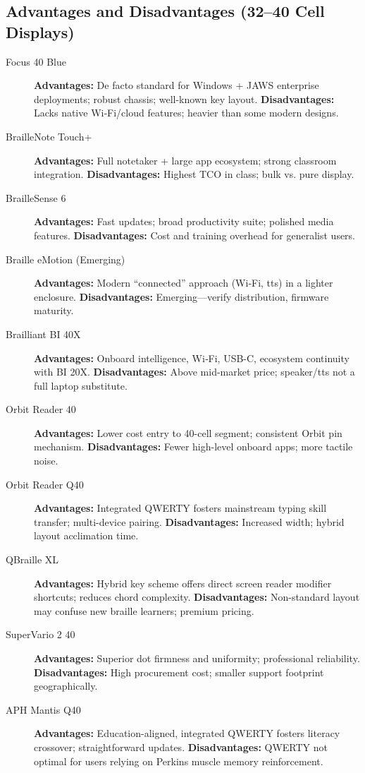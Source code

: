 \subsection*{Advantages and Disadvantages (32--40 Cell Displays)}
\begin{description}
	\item[Focus 40 Blue] \textbf{Advantages:} De facto standard for Windows + JAWS enterprise deployments; robust chassis; well-known key layout. \textbf{Disadvantages:} Lacks native Wi‑Fi/cloud features; heavier than some modern designs.
	\item[BrailleNote Touch+] \textbf{Advantages:} Full notetaker + large app ecosystem; strong classroom integration. \textbf{Disadvantages:} Highest TCO in class; bulk vs. pure display.
	\item[BrailleSense 6] \textbf{Advantages:} Fast updates; broad productivity suite; polished media features. \textbf{Disadvantages:} Cost and training overhead for generalist users.
	\item[Braille eMotion (Emerging)] \textbf{Advantages:} Modern “connected” approach (Wi‑Fi, \gls{tts}) in a lighter enclosure. \textbf{Disadvantages:} Emerging—verify distribution, firmware maturity.
	\item[Brailliant BI 40X] \textbf{Advantages:} Onboard intelligence, Wi‑Fi, USB-C, ecosystem continuity with BI 20X. \textbf{Disadvantages:} Above mid-market price; speaker/\gls{tts} not a full laptop substitute.
	\item[Orbit Reader 40] \textbf{Advantages:} Lower cost entry to 40-cell segment; consistent Orbit pin mechanism. \textbf{Disadvantages:} Fewer high-level onboard apps; more tactile noise.
	\item[Orbit Reader Q40] \textbf{Advantages:} Integrated QWERTY fosters mainstream typing skill transfer; multi-device pairing. \textbf{Disadvantages:} Increased width; hybrid layout acclimation time.
	\item[QBraille XL] \textbf{Advantages:} Hybrid key scheme offers direct screen reader modifier shortcuts; reduces chord complexity. \textbf{Disadvantages:} Non-standard layout may confuse new braille learners; premium pricing.
	\item[SuperVario 2 40] \textbf{Advantages:} Superior dot firmness and uniformity; professional reliability. \textbf{Disadvantages:} High procurement cost; smaller support footprint geographically.
	\item[APH Mantis Q40] \textbf{Advantages:} Education-aligned, integrated QWERTY fosters literacy crossover; straightforward updates. \textbf{Disadvantages:} QWERTY not optimal for users relying on Perkins muscle memory reinforcement.
\end{description}


